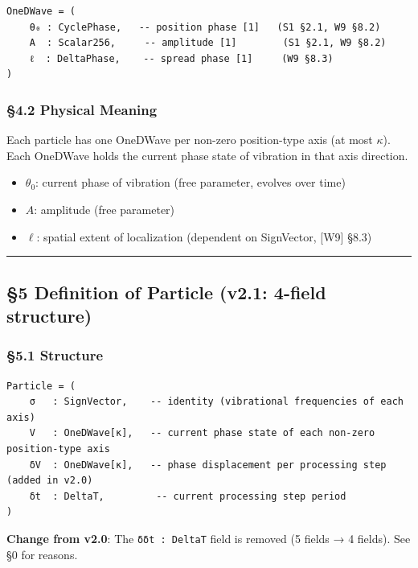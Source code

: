 \documentclass[a4paper,11pt]{article}
\providecommand{\tightlist}{\setlength{\itemsep}{0pt}\setlength{\parskip}{0pt}}
\begin{document}
\begin{verbatim}
OneDWave = (
    θ₀ : CyclePhase,   -- position phase [1]   (S1 §2.1, W9 §8.2)
    A  : Scalar256,     -- amplitude [1]        (S1 §2.1, W9 §8.2)
    ℓ  : DeltaPhase,    -- spread phase [1]     (W9 §8.3)
)
\end{verbatim}

\subsubsection{§4.2 Physical Meaning}\label{physical-meaning-1}

Each particle has one OneDWave per non-zero position-type axis (at most
\(\kappa\)). Each OneDWave holds the current phase state of vibration in
that axis direction.

\begin{itemize}
\tightlist
\item
  \(\theta_0\): current phase of vibration (free parameter, evolves over
  time)
\item
  \(A\): amplitude (free parameter)
\item
  \(\ell\): spatial extent of localization (dependent on SignVector,
  {[}W9{]} §8.3)
\end{itemize}

\begin{center}\rule{0.5\linewidth}{0.5pt}\end{center}

\subsection{§5 Definition of Particle (v2.1: 4-field
structure)}\label{definition-of-particle-v2.1-4-field-structure}

\subsubsection{§5.1 Structure}\label{structure-1}

\begin{verbatim}
Particle = (
    σ   : SignVector,    -- identity (vibrational frequencies of each axis)
    V   : OneDWave[κ],   -- current phase state of each non-zero position-type axis
    δV  : OneDWave[κ],   -- phase displacement per processing step (added in v2.0)
    δt  : DeltaT,         -- current processing step period
)
\end{verbatim}

\textbf{Change from v2.0}: The \texttt{δδt\ :\ DeltaT} field is removed
(5 fields → 4 fields). See §0 for reasons.
\end{document}
